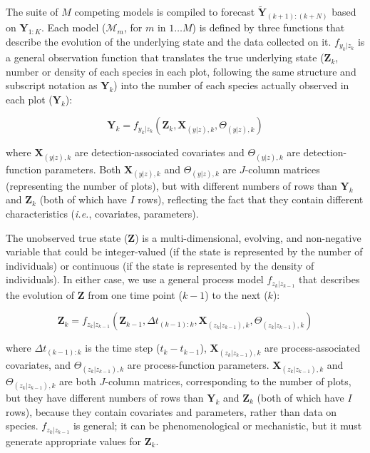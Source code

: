 \documentclass{article}
\begin{document}
The suite of $M$ competing models is compiled to forecast $\tilde{\textbf{Y}}_{(k+1):(k+N)}$ based on $\textbf{Y}_{1:K}$. Each model ($\mathcal{M}_m$, for $m$ in $1 \ldots M$) is defined by three functions that describe the evolution of the underlying state and the data collected on it. $f_{y_k|z_k}$ is a general observation function that translates the true underlying state ($\textbf{Z}_k$, number or density of each species in each plot, following the same structure and subscript notation as $\textbf{Y}_k$) into the number of each species actually observed in each plot ($\textbf{Y}_k$):

\begin{equation}
\label{eq:1}
\textbf{Y}_k = f_{y_k|z_k}(\textbf{Z}_k, \textbf{X}_{(y|z), k}, \Theta_{(y|z), k})
\end{equation}

where $\textbf{X}_{(y|z), k}$ are detection-associated covariates and $\Theta_{(y|z), k}$ are detection-function parameters. Both $\textbf{X}_{(y|z), k}$ and $\Theta_{(y|z), k}$ are $J$-column matrices (representing the number of plots), but with different numbers of rows than $\textbf{Y}_k$ and $\textbf{Z}_k$ (both of which have $I$ rows), reflecting the fact that they contain different characteristics (\emph{i.e.}, covariates, parameters). 

The unobserved true state ($\textbf{Z}$) is a multi-dimensional, evolving, and non-negative variable that could be integer-valued (if the state is represented by the number of individuals) or continuous (if the state is represented by the density of individuals). In either case, we use a general process model $f_{z_k|z_{k-1}}$ that describes the evolution of $\textbf{Z}$ from one time point ($k-1$) to the next ($k$):

\begin{equation}
\label{eq:2}
\textbf{Z}_{k} = f_{z_k|z_{k-1}}(\textbf{Z}_{k-1}, \Delta t_{(k-1):k}, \textbf{X}_{(z_k|z_{k-1}), k},\Theta_{(z_k|z_{k-1}), k})
\end{equation}

where $\Delta t_{(k-1):k}$ is the time step ($t_k - t_{k-1}$), $\textbf{X}_{(z_k|z_{k-1}), k}$ are process-associated covariates, and $\Theta_{(z_k|z_{k-1}), k}$ are process-function parameters. $\textbf{X}_{(z_k|z_{k-1}), k}$ and $\Theta_{(z_k|z_{k-1}), k}$ are both $J$-column matrices, corresponding to  the number of plots, but they have different numbers of rows than $\textbf{Y}_k$ and $\textbf{Z}_k$ (both of which have $I$ rows), because they contain covariates and parameters, rather than data on species. $f_{z_k|z_{k-1}}$ is general; it can be phenomenological or mechanistic, but it must generate appropriate values for $\textbf{Z}_{k}$. 
\end{document}
